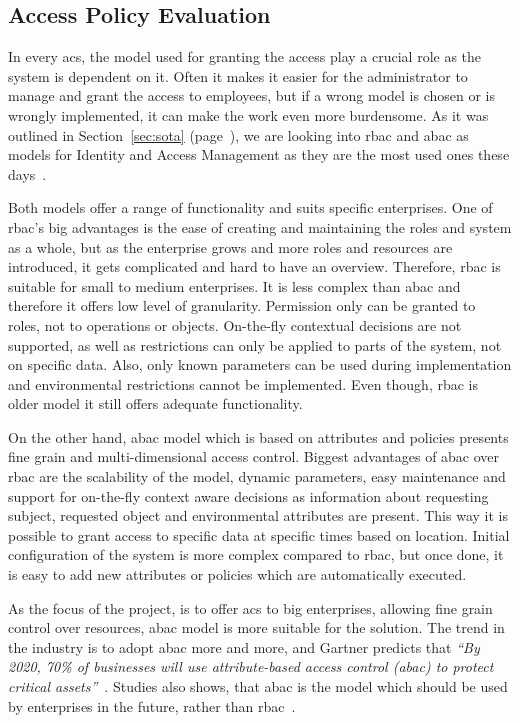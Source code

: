 \subsection{Access Policy Evaluation}\label{sec:analysis-access-policy}

In every \acrlong{acs}, the model used for granting the access play a crucial role as the system is dependent on it. Often it makes it easier for the administrator to manage and grant the access to employees, but if a wrong model is chosen or is wrongly implemented, it can make the work even more burdensome. As it was outlined in Section~\ref{sec:sota} (page~\pageref{sec:sota}), we are looking into \acrshort{rbac} and \acrshort{abac} as models for Identity and Access Management as they are the most used ones these days~\cite{2018BestV3}.

Both models offer a range of functionality and suits specific enterprises. One of \acrshort{rbac}’s big advantages is the ease of creating and maintaining the roles and system as a whole, but as the enterprise grows and more roles and resources are introduced, it gets complicated and hard to have an overview. Therefore, \acrshort{rbac} is suitable for small to medium enterprises. It is less complex than \acrshort{abac} and therefore it offers low level of granularity. Permission only can be granted to roles, not to operations or objects. On-the-fly contextual decisions are not supported, as well as restrictions can only be applied to parts of the system, not on specific data. Also, only known parameters can be used during implementation and environmental restrictions cannot be implemented. Even though, \acrshort{rbac} is older model it still offers adequate functionality.

On the other hand, \acrshort{abac} model which is based on attributes and policies presents fine grain and multi-dimensional access control. Biggest advantages of \acrshort{abac} over \acrshort{rbac} are the scalability of the model, dynamic parameters, easy maintenance and support for on-the-fly context aware decisions as information about requesting subject, requested object and environmental attributes are present. This way it is possible to grant access to specific data at specific times based on location. Initial configuration of the system is more complex compared to \acrshort{rbac}, but once done, it is easy to add new attributes or policies which are automatically executed. 

As the focus of the project, is to offer \acrlong{acs} to big enterprises, allowing fine grain control over resources, \acrlong{abac} model is more suitable for the solution. The trend in the industry is to adopt \acrshort{abac} more and more, and Gartner predicts that \textit{``By 2020, 70\% of businesses will use attribute-based access control (\acrshort{abac}) to protect critical assets''}~\cite{GartnerGartnerPredictions}. Studies also shows, that \acrshort{abac} is the model which should be used by enterprises in the future, rather than \acrshort{rbac}~\cite{Fatima2016TowardsArgument}.

